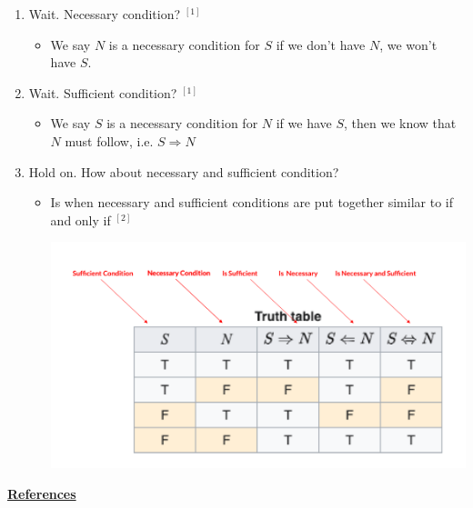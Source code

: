 \documentclass[12pt]{article}
\begin{document}
\begin{itemize}
\begin{mdframed}
        \begin{enumerate}
            \item Wait. Necessary condition? $^{[1]}$
            \begin{itemize}
                \item We say $N$ is a necessary condition for $S$ if we don't have $N$,
                we won't have $S$.
            \end{itemize}
            \item Wait. Sufficient condition? $^{[1]}$
            \begin{itemize}
                \item We say $S$ is a necessary condition for $N$ if we have $S$,
                then we know that $N$ must follow, i.e. $S \Rightarrow N$
            \end{itemize}
            \item Hold on. How about necessary and sufficient condition?
            \begin{itemize}
                \item Is when necessary and sufficient conditions are put together
                similar to if and only if $^{[2]}$

                \begin{center}
                    \includegraphics[width=0.8\linewidth]{../images/week_10_notes_1_2.png}
                \end{center}
            \end{itemize}
        \end{enumerate}

    \end{mdframed}

    \bigskip

    \underline{\textbf{References}}

    \bigskip


\end{itemize}
\end{document}
